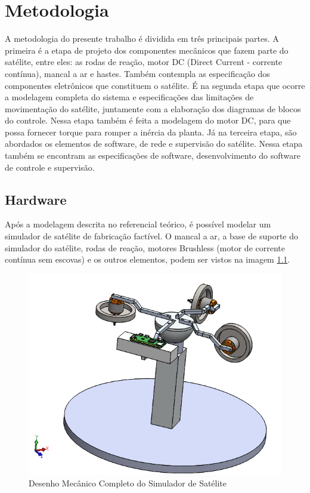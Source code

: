 \chapter{Metodologia}

A metodologia do presente trabalho é dividida em três principais partes. A primeira é a etapa de projeto dos componentes mecânicos que fazem parte do satélite, entre eles: as rodas de reação, motor DC (Direct Current - corrente contínua), mancal a ar e hastes. Também contempla as especificação dos componentes eletrônicos que constituem o satélite. É na segunda etapa que ocorre a modelagem completa do sistema e especificações das limitações de movimentação do satélite, juntamente com a elaboração dos diagramas de blocos do controle. Nessa etapa também é feita a modelagem do motor DC, para que possa fornecer torque para romper a inércia da planta. Já na terceira etapa, são abordados os elementos de software, de rede e supervisão do satélite. Nessa etapa também se encontram as especificações de software, desenvolvimento do software de controle e supervisão.

\section{Hardware}

Após a modelagem descrita no referencial teórico, é possível modelar um simulador de satélite de fabricação factível.  O mancal a ar, a base de suporte do simulador do satélite, rodas de reação, motores Brushless (motor de corrente contínua sem escovas) e os outros elementos, podem ser vistos na imagem \ref{fig:satelite_completo}.

\begin{figure}[H]
  \caption{Desenho Mecânico Completo do Simulador de Satélite}
  \begin{center}
      \includegraphics[scale=.6]{metodologia/img/satelite_completo}
  \end{center}
  \label{fig:satelite_completo}
\end{figure}

